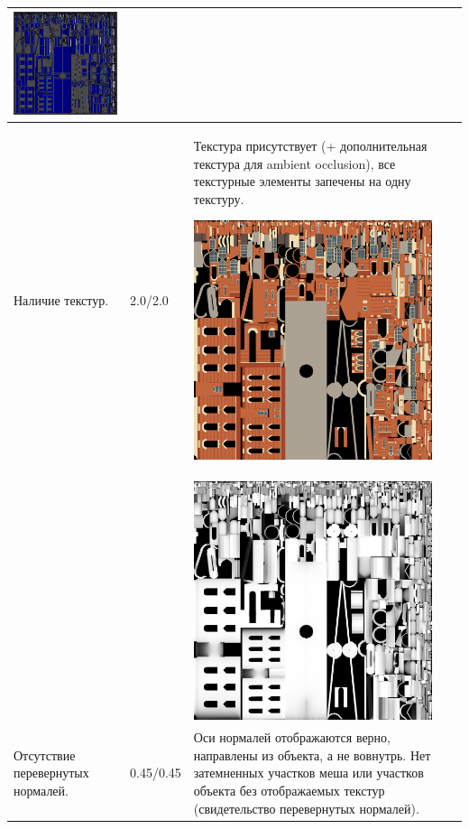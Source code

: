 \begin{longtable}{|p{4cm}|p{2.5cm}|p{7.5cm}|}
    \includegraphics[width=7cm]{src/uv_4}
    \\
    \hline
    Наличие текстур. & 2.0/2.0 & Текстура присутствует (+ дополнительная текстура для ambient occlusion), все текстурные элементы запечены на одну текстуру.

    \includegraphics[width=7cm]{src/tec_7}\\
    & & \includegraphics[width=7cm]{src/tec_8} \\
    \hline
    Отсутствие перевернутых нормалей. & 0.45/0.45 & Оси нормалей отображаются верно, направлены из объекта, а не вовнутрь. Нет затемненных участков меша или участков объекта без отображаемых текстур (свидетельство перевернутых нормалей).


\end{longtable}

